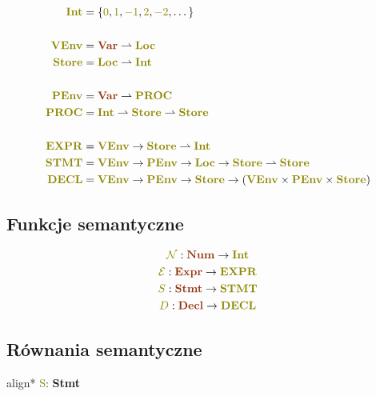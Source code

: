 \documentclass{article}
\newcommand{\pto}{\rightharpoonup}
\newcommand{\syn}[1]{{\bf \textcolor{RawSienna}{#1}}}
\newcommand{\sem}[1]{{\bf \textcolor{olive}{#1}}}
\newcommand{\semcol}[1]{{\textcolor{olive}{#1}}}
\newcommand{\boxedeq}[1]{\begin{empheq}[box={\fboxsep=6pt\fbox}]{align*}#1\end{empheq}}
\newcommand{\bigeps}{\mathcal{E}}
\begin{document}
   \begin{gather*}
      \begin{aligned}
         \sem{Int} &= \{\semcol{0}, \semcol{1}, \semcol{-1}, \semcol{2}, \semcol{-2}, \dots\} \\
         \\
         \sem{VEnv} &= \syn{Var} \pto \sem{Loc} \\
         \sem{Store} &= \sem{Loc} \pto \sem{Int} \\
         \\
         \sem{PEnv} &= \syn{Var} \pto \sem{PROC} \\
         \sem{PROC} &= \sem{Int} \pto \sem{Store} \pto \sem{Store}\\
         \\
         \sem{EXPR} &= \sem{VEnv} \to \sem{Store} \pto \sem{Int} \\
         \sem{STMT} &=\sem{VEnv}\to \sem{PEnv}\to \sem{Loc} \to \sem{Store} \pto \sem{Store} \\
         \sem{DECL} &= \sem{VEnv} \to \sem{PEnv} \to \sem{Store} \to (\sem{VEnv} \times \sem{PEnv} \times \sem{Store})  \\
      \end{aligned}
   \end{gather*}


   \subsection{Funkcje semantyczne}

   \begin{gather*}
      \semcol{\mathcal{N}}: \syn{Num} \to \sem{Int} \\
      \semcol{\bigeps}: \syn{Expr} \to \sem{EXPR} \\
      \semcol{S}: \syn{Stmt} \to \sem{STMT} \\
      \semcol{D}: \syn{Decl} \to \sem{DECL} \\
   \end{gather*}


   \subsection{Równania semantyczne}

   \boxedeq{ \semcol{S}: \syn{Stmt} \to \sem{STMT} }
\end{document}
